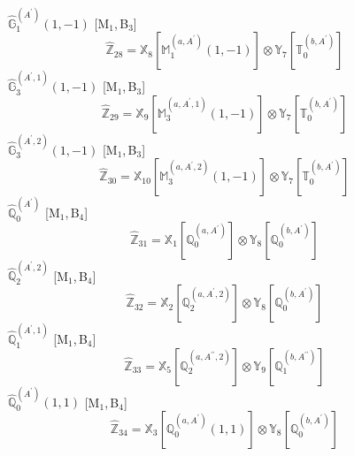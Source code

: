 \documentclass[fleqn,10pt,landscape]{article}
\begin{document}
\begin{itemize}
\noindent {} $\,\,\,\hat{\mathbb{G}}_{1}^{(A^{\prime})}(1,-1)$ [M$_{1}$,\,B$_{3}$]
\begin{dmath*}
\hat{\mathbb{Z}}_{28}=\mathbb{X}_{8}[\mathbb{M}_{1}^{(a,A^{\prime})}(1,-1)] \otimes\mathbb{Y}_{7}[\mathbb{T}_{0}^{(b,A^{\prime})}]
\end{dmath*}
\vspace{4mm}
\noindent {} $\,\,\,\hat{\mathbb{G}}_{3}^{(A^{\prime},1)}(1,-1)$ [M$_{1}$,\,B$_{3}$]
\begin{dmath*}
\hat{\mathbb{Z}}_{29}=\mathbb{X}_{9}[\mathbb{M}_{3}^{(a,A^{\prime},1)}(1,-1)] \otimes\mathbb{Y}_{7}[\mathbb{T}_{0}^{(b,A^{\prime})}]
\end{dmath*}
\vspace{4mm}
\noindent {} $\,\,\,\hat{\mathbb{G}}_{3}^{(A^{\prime},2)}(1,-1)$ [M$_{1}$,\,B$_{3}$]
\begin{dmath*}
\hat{\mathbb{Z}}_{30}=\mathbb{X}_{10}[\mathbb{M}_{3}^{(a,A^{\prime},2)}(1,-1)] \otimes\mathbb{Y}_{7}[\mathbb{T}_{0}^{(b,A^{\prime})}]
\end{dmath*}
\vspace{4mm}
\noindent {} $\,\,\,\hat{\mathbb{Q}}_{0}^{(A^{\prime})}$ [M$_{1}$,\,B$_{4}$]
\begin{dmath*}
\hat{\mathbb{Z}}_{31}=\mathbb{X}_{1}[\mathbb{Q}_{0}^{(a,A^{\prime})}] \otimes\mathbb{Y}_{8}[\mathbb{Q}_{0}^{(b,A^{\prime})}]
\end{dmath*}
\vspace{4mm}
\noindent {} $\,\,\,\hat{\mathbb{Q}}_{2}^{(A^{\prime},2)}$ [M$_{1}$,\,B$_{4}$]
\begin{dmath*}
\hat{\mathbb{Z}}_{32}=\mathbb{X}_{2}[\mathbb{Q}_{2}^{(a,A^{\prime},2)}] \otimes\mathbb{Y}_{8}[\mathbb{Q}_{0}^{(b,A^{\prime})}]
\end{dmath*}
\vspace{4mm}
\noindent {} $\,\,\,\hat{\mathbb{Q}}_{1}^{(A^{\prime},1)}$ [M$_{1}$,\,B$_{4}$]
\begin{dmath*}
\hat{\mathbb{Z}}_{33}=\mathbb{X}_{5}[\mathbb{Q}_{2}^{(a,A^{\prime\prime},2)}] \otimes\mathbb{Y}_{9}[\mathbb{Q}_{1}^{(b,A^{\prime\prime})}]
\end{dmath*}
\vspace{4mm}
\noindent {} $\,\,\,\hat{\mathbb{Q}}_{0}^{(A^{\prime})}(1,1)$ [M$_{1}$,\,B$_{4}$]
\begin{dmath*}
\hat{\mathbb{Z}}_{34}=\mathbb{X}_{3}[\mathbb{Q}_{0}^{(a,A^{\prime})}(1,1)] \otimes\mathbb{Y}_{8}[\mathbb{Q}_{0}^{(b,A^{\prime})}]

\end{dmath*}
\end{itemize}
\end{document}
